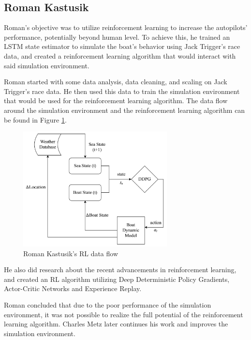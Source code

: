 \documentclass[12pt,twoside]{report}
\begin{document}
\subsection{Roman Kastusik}
Roman's \cite{roman} objective was to utilize reinforcement learning to increase the autopilots' performance, potentially beyond human level. To achieve this, he trained an LSTM state estimator to simulate the boat's behavior using Jack Trigger's race data, and created a reinforcement learning algorithm that would interact with said simulation environment.

Roman started with some data analysis, data cleaning, and scaling on Jack Trigger's race data. He then used this data to train the simulation environment that would be used for the reinforcement learning algorithm. The data flow around the simulation environment and the reinforcement learning algorithm can be found in Figure \ref{fig:roman dataflow}.

\begin{figure}[h]
\centering
\includegraphics[width = 0.7\textwidth]{figures/roman data flow.png}
\caption{Roman Kastusik's RL data flow \cite{roman}}
\label{fig:roman dataflow}
\end{figure}

He also did research about the recent advancements in reinforcement learning, and created an RL algorithm utilizing Deep Deterministic Policy Gradients, Actor-Critic Networks and Experience Replay.

Roman concluded that due to the poor performance of the simulation environment, it was not possible to realize the full potential of the reinforcement learning algorithm. Charles Metz later continues his work and improves the simulation environment.
\end{document}
